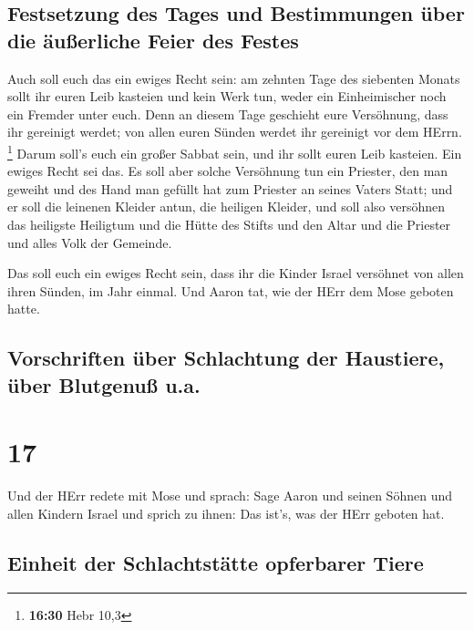 \hypertarget{festsetzung-des-tages-und-bestimmungen-uxfcber-die-uxe4uuxdferliche-feier-des-festes}{%
\subsection{Festsetzung des Tages und Bestimmungen über die äußerliche
Feier des
Festes}\label{festsetzung-des-tages-und-bestimmungen-uxfcber-die-uxe4uuxdferliche-feier-des-festes}}

 Auch soll euch das ein ewiges Recht sein: am zehnten
Tage des siebenten Monats sollt ihr euren Leib kasteien und kein Werk
tun, weder ein Einheimischer noch ein Fremder unter euch.
 Denn an diesem Tage geschieht eure Versöhnung, dass ihr
gereinigt werdet; von allen euren Sünden werdet ihr gereinigt vor dem
HErrn. \footnote{\textbf{16:30} Hebr 10,3}  Darum soll's
euch ein großer Sabbat sein, und ihr sollt euren Leib kasteien. Ein
ewiges Recht sei das.  Es soll aber solche Versöhnung tun
ein Priester, den man geweiht und des Hand man gefüllt hat zum Priester
an seines Vaters Statt; und er soll die leinenen Kleider antun, die
heiligen Kleider,  und soll also versöhnen das heiligste
Heiligtum und die Hütte des Stifts und den Altar und die Priester und
alles Volk der Gemeinde.

 Das soll euch ein ewiges Recht sein, dass ihr die Kinder
Israel versöhnet von allen ihren Sünden, im Jahr einmal. Und Aaron tat,
wie der HErr dem Mose geboten hatte.

\hypertarget{vorschriften-uxfcber-schlachtung-der-haustiere-uxfcber-blutgenuuxdf-u.a.}{%
\subsection{Vorschriften über Schlachtung der Haustiere, über Blutgenuß
u.a.}\label{vorschriften-uxfcber-schlachtung-der-haustiere-uxfcber-blutgenuuxdf-u.a.}}

\hypertarget{section-16}{%
\section{17}\label{section-16}}

 Und der HErr redete mit Mose und sprach: 
Sage Aaron und seinen Söhnen und allen Kindern Israel und sprich zu
ihnen: Das ist's, was der HErr geboten hat.

\hypertarget{einheit-der-schlachtstuxe4tte-opferbarer-tiere}{%
\subsection{Einheit der Schlachtstätte opferbarer
Tiere}\label{einheit-der-schlachtstuxe4tte-opferbarer-tiere}}


